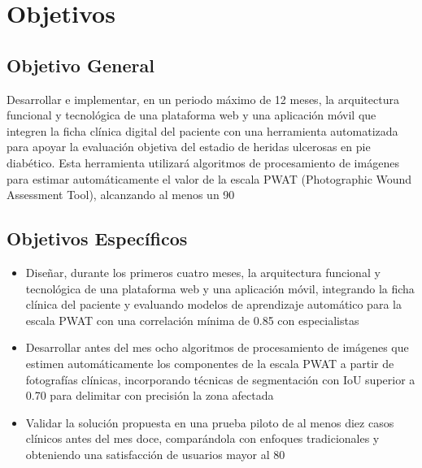 \section{Objetivos}

\subsection{Objetivo General}
\label{sc:OG}
Desarrollar e implementar, en un periodo máximo de 12 meses, la arquitectura funcional y tecnológica de una plataforma web y una aplicación móvil que integren la ficha clínica digital del paciente con una herramienta automatizada para apoyar la evaluación objetiva del estadio de heridas ulcerosas en pie diabético. Esta herramienta utilizará algoritmos de procesamiento de imágenes para estimar automáticamente el valor de la escala PWAT (Photographic Wound Assessment Tool), alcanzando al menos un 90%

\subsection{Objetivos Específicos}
\label{ssc:OE}

\begin{itemize}
    \item Diseñar, durante los primeros cuatro meses, la arquitectura funcional y tecnológica de una plataforma web y una aplicación móvil, integrando la ficha clínica del paciente y evaluando modelos de aprendizaje automático para la escala PWAT con una correlación mínima de 0.85 con especialistas
    \item Desarrollar antes del mes ocho algoritmos de procesamiento de imágenes que estimen automáticamente los componentes de la escala PWAT a partir de fotografías clínicas, incorporando técnicas de segmentación con IoU superior a 0.70 para delimitar con precisión la zona afectada
    \item Validar la solución propuesta en una prueba piloto de al menos diez casos clínicos antes del mes doce, comparándola con enfoques tradicionales y obteniendo una satisfacción de usuarios mayor al 80%
\end{itemize}

